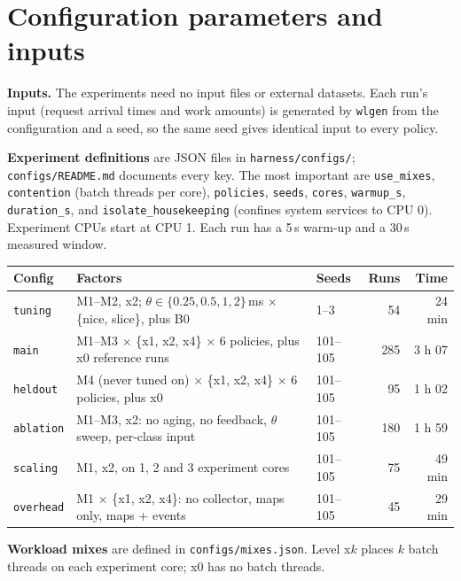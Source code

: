 \documentclass[10.5pt,a4paper]{article}
\newcommand{\f}[1]{\texttt{#1}}
\begin{document}
\section{Configuration parameters and inputs}

\textbf{Inputs.} The experiments need no input files or external datasets. Each run's input (request arrival times and work amounts) is generated by \f{wlgen} from the configuration and a seed, so the same seed gives identical input to every policy.

\textbf{Experiment definitions} are JSON files in \f{harness/configs/}; \f{configs/README.md} documents every key. The most important are \f{use\_mixes}, \f{contention} (batch threads per core), \f{policies}, \f{seeds}, \f{cores}, \f{warmup\_s}, \f{duration\_s}, and \f{isolate\_housekeeping} (confines system services to CPU 0). Experiment CPUs start at CPU 1. Each run has a 5\,s warm-up and a 30\,s measured window.

\begin{center}
\begin{tabularx}{\textwidth}{@{}lLlrr@{}}
\toprule
\textbf{Config} & \textbf{Factors} & \textbf{Seeds} & \textbf{Runs} & \textbf{Time} \\
\midrule
\f{tuning} & M1--M2, x2; $\theta \in \{0.25, 0.5, 1, 2\}$\,ms $\times$ \{nice, slice\}, plus B0 & 1--3 & 54 & 24 min \\
\f{main} & M1--M3 $\times$ \{x1, x2, x4\} $\times$ 6 policies, plus x0 reference runs & 101--105 & 285 & 3 h 07 \\
\f{heldout} & M4 (never tuned on) $\times$ \{x1, x2, x4\} $\times$ 6 policies, plus x0 & 101--105 & 95 & 1 h 02 \\
\f{ablation} & M1--M3, x2: no aging, no feedback, $\theta$ sweep, per-class input & 101--105 & 180 & 1 h 59 \\
\f{scaling} & M1, x2, on 1, 2 and 3 experiment cores & 101--105 & 75 & 49 min \\
\f{overhead} & M1 $\times$ \{x1, x2, x4\}: no collector, maps only, maps + events & 101--105 & 45 & 29 min \\
\bottomrule
\end{tabularx}
\end{center}

\textbf{Workload mixes} are defined in \f{configs/mixes.json}. Level x$k$ places $k$ batch threads on each experiment core; x0 has no batch threads.
\end{document}
